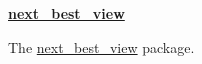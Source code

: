 

{\bfseries \hyperlink{namespacenext__best__view}{next\-\_\-best\-\_\-view}} 

\-The \hyperlink{namespacenext__best__view}{next\-\_\-best\-\_\-view} package. 